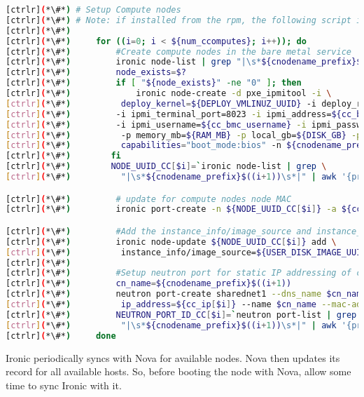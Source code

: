 
\begin{lstlisting}[language=bash,keywords={}]
[ctrlr](*\#*) # Setup Compute nodes
[ctrlr](*\#*) # Note: if installed from the rpm, the following script is installed as setup_compute_nodes.sh 
[ctrlr](*\#*) 
[ctrlr](*\#*)     for ((i=0; i < ${num_ccomputes}; i++)); do
[ctrlr](*\#*)         #Create compute nodes in the bare metal service
[ctrlr](*\#*)         ironic node-list | grep "|\s*${cnodename_prefix}$((i+1))\s*|"
[ctrlr](*\#*)         node_exists=$?
[ctrlr](*\#*)         if [ "${node_exists}" -ne "0" ]; then
[ctrlr](*\#*)             ironic node-create -d pxe_ipmitool -i \
[ctrlr](*\#*)          deploy_kernel=${DEPLOY_VMLINUZ_UUID} -i deploy_ramdisk=${DEPLOY_INITRD_UUID} \
[ctrlr](*\#*)         -i ipmi_terminal_port=8023 -i ipmi_address=${cc_bmc[$i]} \
[ctrlr](*\#*)         -i ipmi_username=${cc_bmc_username} -i ipmi_password=${cc_bmc_password} -p cpus=${CPU} \
[ctrlr](*\#*)          -p memory_mb=${RAM_MB} -p local_gb=${DISK_GB} -p cpu_arch=${ARCH} -p \
[ctrlr](*\#*)          capabilities="boot_mode:bios" -n ${cnodename_prefix}$((i+1))
[ctrlr](*\#*)        fi
[ctrlr](*\#*)        NODE_UUID_CC[$i]=`ironic node-list | grep \
[ctrlr](*\#*)          "|\s*${cnodename_prefix}$((i+1))\s*|" | awk '{print $2}'`

[ctrlr](*\#*)         # update for compute nodes node MAC
[ctrlr](*\#*)         ironic port-create -n ${NODE_UUID_CC[$i]} -a ${cc_mac[$i]}

[ctrlr](*\#*)         #Add the instance_info/image_source and instance_info/root_gb
[ctrlr](*\#*)         ironic node-update ${NODE_UUID_CC[$i]} add \
[ctrlr](*\#*)          instance_info/image_source=${USER_DISK_IMAGE_UUID} instance_info/root_gb=50
[ctrlr](*\#*) 
[ctrlr](*\#*)         #Setup neutron port for static IP addressing of compute nodes
[ctrlr](*\#*)         cn_name=${cnodename_prefix}$((i+1))
[ctrlr](*\#*)         neutron port-create sharednet1 --dns_name $cn_name --fixed-ip \
[ctrlr](*\#*)          ip_address=${cc_ip[$i]} --name $cn_name --mac-address ${cc_mac[$i]}
[ctrlr](*\#*)         NEUTRON_PORT_ID_CC[$i]=`neutron port-list | grep \
[ctrlr](*\#*)          "|\s*${cnodename_prefix}$((i+1))\s*|" | awk '{print $2}'`
[ctrlr](*\#*)     done
\end{lstlisting} 
\newpage

	Ironic periodically syncs with Nova for available nodes. Nova then updates its record for all available hosts. So, before booting the node with Nova, allow some time to sync Ironic with it. 

